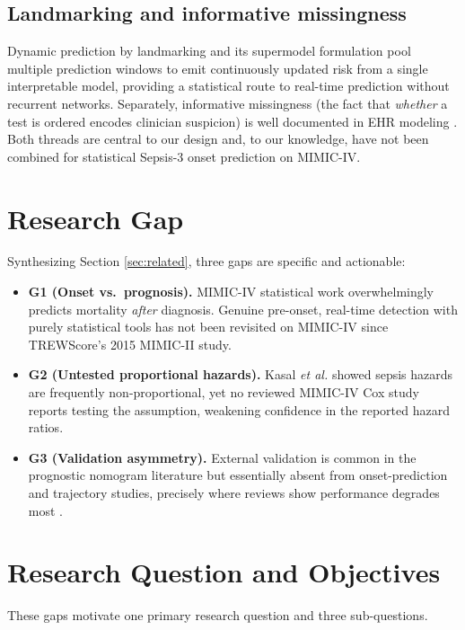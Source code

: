 \documentclass[conference]{IEEEtran}
\begin{document}
\subsection{Landmarking and informative missingness}
Dynamic prediction by landmarking \cite{vanhouwelingen2007landmark} and its
supermodel formulation \cite{fries2023dynamiclm} pool multiple prediction
windows to emit continuously updated risk from a single interpretable model,
providing a statistical route to real-time prediction without recurrent
networks. Separately, informative missingness (the fact that \emph{whether} a
test is ordered encodes clinician suspicion) is well documented in EHR
modeling \cite{groenwold2020missingness,singh2021missingness}. Both threads are
central to our design and, to our knowledge, have not been combined for
statistical Sepsis-3 onset prediction on MIMIC-IV.

\section{Research Gap}
\label{sec:gap}
Synthesizing Section \ref{sec:related}, three gaps are specific and actionable:

\begin{itemize}
\item \textbf{G1 (Onset vs.\ prognosis).} MIMIC-IV statistical work overwhelmingly
predicts mortality \emph{after} diagnosis. Genuine pre-onset, real-time
detection with purely statistical tools has not been revisited on MIMIC-IV
since TREWScore's 2015 MIMIC-II study.
\item \textbf{G2 (Untested proportional hazards).} Kasal \emph{et al.}
\cite{kasal2004cox} showed sepsis hazards are frequently non-proportional, yet
no reviewed MIMIC-IV Cox study reports testing the assumption, weakening
confidence in the reported hazard ratios.
\item \textbf{G3 (Validation asymmetry).} External validation is common in the
prognostic nomogram literature but essentially absent from onset-prediction and
trajectory studies, precisely where reviews show performance degrades most
\cite{wang2025srpm}.
\end{itemize}

\section{Research Question and Objectives}
\label{sec:rq}
These gaps motivate one primary research question and three sub-questions.
\end{document}
